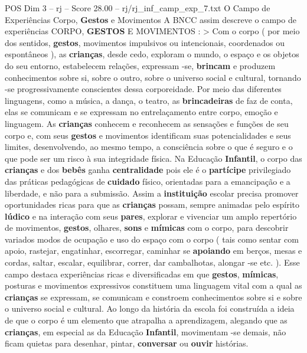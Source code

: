 \begin{textsample}{POS Dim 3 – rj – Score 28.00 – rj/rj\_inf\_camp\_exp\_7.txt}  \label{ex:f3_pos_002}
O Campo de Experiências Corpo, \textbf{Gestos} e Movimentos A BNCC assim descreve o campo de experiências CORPO, \textbf{GESTOS} E MOVIMENTOS : > Com o corpo ( por meio dos sentidos, \textbf{gestos}, movimentos impulsivos ou intencionais, coordenados ou espontâneos ), as \textbf{crianças}, desde cedo, exploram o mundo, o espaço e os objetos do seu entorno, estabelecem relações, expressam -se, \textbf{brincam} e produzem conhecimentos sobre si, sobre o outro, sobre o universo social e cultural, tornando -se progressivamente conscientes dessa corporeidade.
Por meio das diferentes linguagens, como a música, a dança, o teatro, as \textbf{brincadeiras} de faz de conta, elas se comunicam e se expressam no entrelaçamento entre corpo, emoção e linguagem.
As \textbf{crianças} conhecem e reconhecem as sensações e funções de seu corpo e, com seus \textbf{gestos} e movimentos identificam suas potencialidades e seus limites, desenvolvendo, ao mesmo tempo, a consciência sobre o que é seguro e o que pode ser um risco à sua integridade física.
Na Educação \textbf{Infantil}, o corpo das \textbf{crianças} e dos \textbf{bebês} ganha \textbf{centralidade} pois ele é o \textbf{partícipe} privilegiado das práticas pedagógicas de \textbf{cuidado} físico, orientadas para a emancipação e a liberdade, e não para a submissão.
Assim a \textbf{instituição} escolar precisa promover oportunidades ricas para que as \textbf{crianças} possam, sempre animadas pelo espírito \textbf{lúdico} e na interação com seus \textbf{pares}, explorar e vivenciar um amplo repertório de movimentos, \textbf{gestos}, olhares, \textbf{sons} e \textbf{mímicas} com o corpo, para descobrir variados modos de ocupação e uso do espaço com o corpo ( tais como sentar com apoio, rastejar, engatinhar, escorregar, caminhar se \textbf{apoiando} em berços, mesas e cordas, saltar, escalar, equilibrar, correr, dar cambalhotas, alongar -se etc. ).
Esse campo destaca experiências ricas e diversificadas em que \textbf{gestos}, \textbf{mímicas}, posturas e movimentos expressivos constituem uma linguagem vital com a qual as \textbf{crianças} se expressam, se comunicam e constroem conhecimentos sobre si e sobre o universo social e cultural.
Ao longo da história da escola foi construída a ideia de que o corpo é um elemento que atrapalha a aprendizagem, alegando que as \textbf{crianças}, em especial as da Educação \textbf{Infantil}, movimentam -se demais, não ficam quietas para desenhar, pintar, \textbf{conversar} ou \textbf{ouvir} histórias.

\end{textsample}
